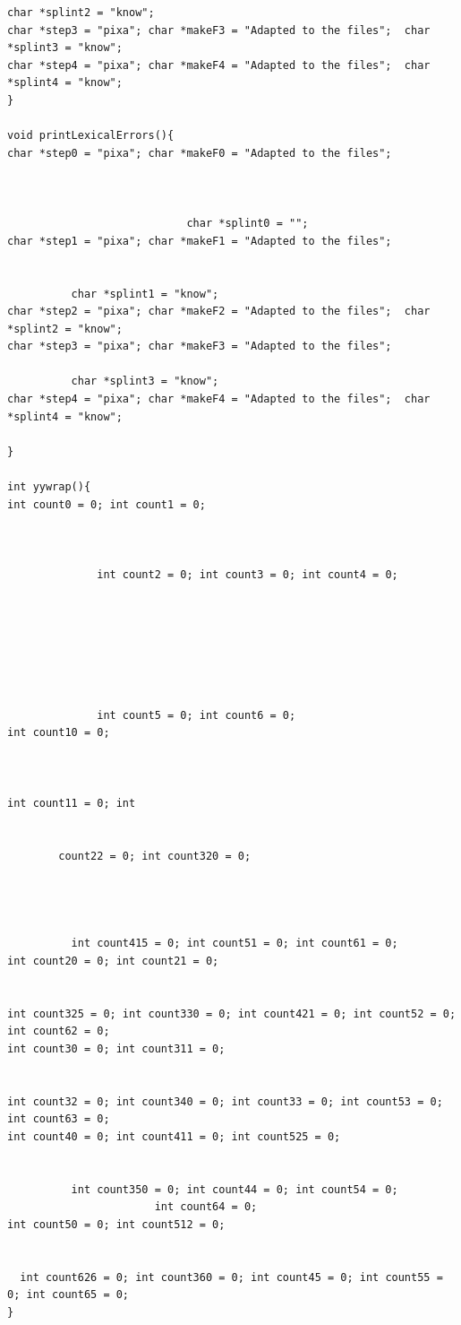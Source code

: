 \documentclass[10pt]{beamer}
\begin{document}
\begin{lstlisting}[style=CStyle]
      char *splint2 = "know"; 
char *step3 = "pixa"; char *makeF3 = "Adapted to the files";  char *splint3 = "know"; 
char *step4 = "pixa"; char *makeF4 = "Adapted to the files";  char *splint4 = "know"; 
}

void printLexicalErrors(){
char *step0 = "pixa"; char *makeF0 = "Adapted to the files";  


    
                            char *splint0 = ""; 
char *step1 = "pixa"; char *makeF1 = "Adapted to the files";  


          char *splint1 = "know"; 
char *step2 = "pixa"; char *makeF2 = "Adapted to the files";  char *splint2 = "know"; 
char *step3 = "pixa"; char *makeF3 = "Adapted to the files";  

          char *splint3 = "know"; 
char *step4 = "pixa"; char *makeF4 = "Adapted to the files";  char *splint4 = "know"; 

}

int yywrap(){
int count0 = 0; int count1 = 0; 



              int count2 = 0; int count3 = 0; int count4 = 0; 
              
              
              
              
              
              
              
              int count5 = 0; int count6 = 0;
int count10 = 0; 



int count11 = 0; int 


        count22 = 0; int count320 = 0; 
        
        
        
        
          int count415 = 0; int count51 = 0; int count61 = 0;
int count20 = 0; int count21 = 0; 


int count325 = 0; int count330 = 0; int count421 = 0; int count52 = 0; int count62 = 0;
int count30 = 0; int count311 = 0; 


int count32 = 0; int count340 = 0; int count33 = 0; int count53 = 0; int count63 = 0;
int count40 = 0; int count411 = 0; int count525 = 0; 


          int count350 = 0; int count44 = 0; int count54 = 0;
                       int count64 = 0;
int count50 = 0; int count512 = 0; 


  int count626 = 0; int count360 = 0; int count45 = 0; int count55 = 0; int count65 = 0;
}


\end{lstlisting}
\end{document}
